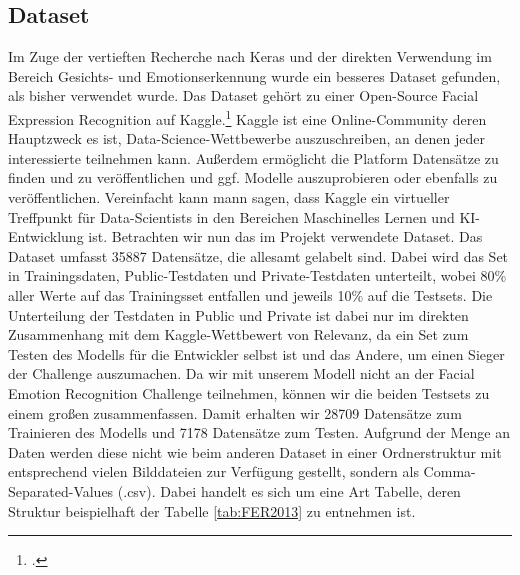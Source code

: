 \documentclass[12pt, a4paper]{report}
\begin{document}
\subsection{Dataset}
Im Zuge der vertieften Recherche nach Keras und der direkten Verwendung im Bereich Gesichts- und Emotionserkennung wurde ein besseres Dataset gefunden, als bisher verwendet wurde. Das Dataset gehört zu einer Open-Source Facial Expression Recognition auf Kaggle.\footcite[Vgl.][]{FER-Challenge} Kaggle ist eine Online-Community deren Hauptzweck es ist, Data-Science-Wettbewerbe auszuschreiben, an denen jeder interessierte teilnehmen kann. Außerdem ermöglicht die Platform Datensätze zu finden und zu veröffentlichen und ggf. Modelle auszuprobieren oder ebenfalls zu veröffentlichen. Vereinfacht kann mann sagen, dass Kaggle ein virtueller Treffpunkt für Data-Scientists in den Bereichen Maschinelles Lernen und KI-Entwicklung ist.\newline
Betrachten wir nun das im Projekt verwendete Dataset.
Das Dataset umfasst 35887 Datensätze, die allesamt gelabelt sind. Dabei wird das Set in Trainingsdaten, Public-Testdaten und Private-Testdaten unterteilt, wobei 80\% aller Werte auf das Trainingsset entfallen und jeweils 10\% auf die Testsets. Die Unterteilung der Testdaten in Public und Private ist dabei nur im direkten Zusammenhang mit dem Kaggle-Wettbewert von Relevanz, da ein Set zum Testen des Modells für die Entwickler selbst ist und das Andere, um einen Sieger der Challenge auszumachen. Da wir mit unserem Modell nicht an der Facial Emotion Recognition Challenge teilnehmen, können wir die beiden Testsets zu einem großen zusammenfassen. Damit erhalten wir 28709 Datensätze zum Trainieren des Modells und 7178 Datensätze zum Testen. Aufgrund der Menge an Daten werden diese nicht wie beim anderen Dataset in einer Ordnerstruktur mit entsprechend vielen Bilddateien zur Verfügung gestellt, sondern als Comma-Separated-Values (.csv). Dabei handelt es sich um eine Art Tabelle, deren Struktur beispielhaft der Tabelle \ref{tab:FER2013} zu entnehmen ist.
\end{document}
